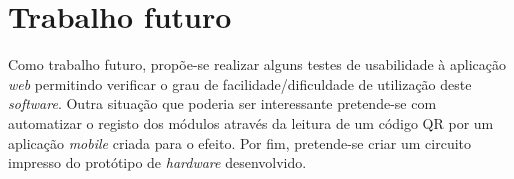 



\section{Trabalho futuro}



Como trabalho futuro, propõe-se realizar alguns testes de usabilidade à aplicação \textit{web} permitindo verificar o grau de facilidade/dificuldade de utilização deste \textit{software}. Outra situação que poderia ser interessante pretende-se com automatizar o registo dos módulos através da leitura de um código \ac{QR} por um aplicação \textit{mobile} criada para o efeito. Por fim, pretende-se criar um circuito impresso do protótipo de \textit{hardware} desenvolvido. 











 
